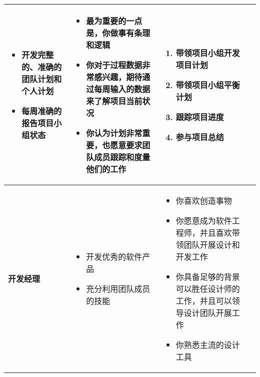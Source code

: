 \begin{spacing}{1.2}
\begin{longtable}{|m{1.5cm}<{\centering}|m{4.2cm}|m{4.2cm}|m{4.2cm}|}
        \begin{itemize}[leftmargin=1.3em]
            \item 开发完整的、准确的团队计划和个人计划
            \item 每周准确的报告项目小组状态
            \vspace{-1.3em}
        \end{itemize} &
        \vspace{-1.1em}
        \begin{itemize}[leftmargin=1.3em]
            \item 最为重要的一点是，你做事有条理和逻辑
            \item 你对于过程数据非常感兴趣，期待通过每周输入的数据来了解项目当前状况
            \item 你认为计划非常重要，也愿意要求团队成员跟踪和度量他们的工作
            \vspace{-1.3em}
        \end{itemize} &
        \vspace{-1.1em}
        \begin{enumerate}[label=\arabic*.,leftmargin=1.5em]
            \item 带领项目小组开发项目计划
            \item 带领项目小组平衡计划
            \item 跟踪项目进度
            \item 参与项目总结
            \vspace{-1.3em}
        \end{enumerate} \\ \hline
        \textbf{开发经理} & 
        \vspace{-1.1em}
        \begin{itemize}[leftmargin=1.3em]
            \item 开发优秀的软件产品
            \item 充分利用团队成员的技能
            \vspace{-1.3em}
        \end{itemize} &
        \vspace{-1.1em}
        \begin{itemize}[leftmargin=1.3em]
            \item 你喜欢创造事物
            \item 你愿意成为软件工程师，并且喜欢带领团队开展设计和开发工作
            \item 你具备足够的背景可以胜任设计师的工作，并且可以领导设计团队开展工作
            \item 你熟悉主流的设计工具

\end{itemize}
\end{longtable}
\end{spacing}
